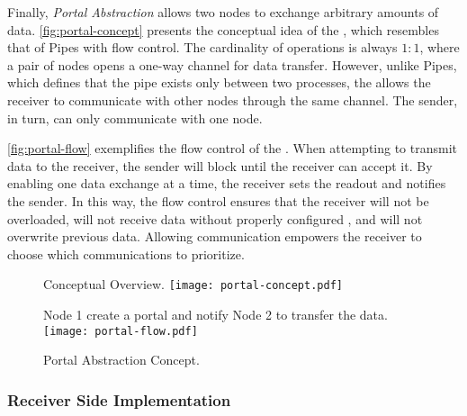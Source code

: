 			Finally, \textit{Portal Abstraction} allows two nodes to exchange arbitrary
			amounts of data. \autoref{fig:portal-concept} presents the conceptual idea
			of the \portal, which resembles that of \posix Pipes with flow control.
			The cardinality of operations is always $1:1$, where a pair of nodes opens
			a one-way channel for data transfer. However, unlike \posix Pipes, which
			defines that the pipe exists only between two processes, the \portal allows
			the receiver to communicate with other nodes through the same channel.
			The sender, in turn, can only communicate with one node.

			\autoref{fig:portal-flow} exemplifies the flow control of the \portal.
			When attempting to transmit data to the receiver, the sender will block
			until the receiver can accept it. By enabling one data exchange at a time,
			the receiver sets the readout and notifies the sender. In this way,
			the flow control ensures that the receiver will not be overloaded, will
			not receive data without properly configured \dma, and will not overwrite
			previous data. Allowing communication empowers the receiver to choose which
			communications to prioritize.

			\begin{figure}[!tb]
				\centering%
				\caption{Portal Abstraction Concept.}%
				\label{fig:portal}%

					{Conceptual Overview.}%
					{\texttt{[image: portal-concept.pdf]}}%

				\hfill

					{Node 1 create a portal and notify Node 2 to transfer the data.}%
					{\texttt{[image: portal-flow.pdf]}}%

			\end{figure}

			\subsubsection{Receiver Side Implementation}



